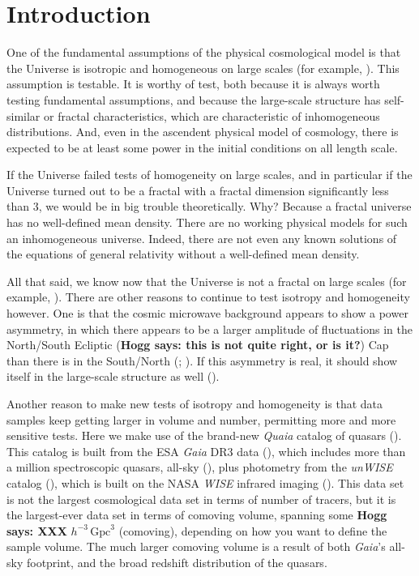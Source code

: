 \documentclass[modern]{aastex631}
\newcommand{\unit}[1]{\mathrm{#1}}
\newcommand{\Gpc}{\unit{Gpc}}
\newcommand{\hogg}[1]{\textbf{Hogg says: #1}}
\begin{document}
\section*{}
\clearpage
\section{Introduction}\label{sec:intro}\noindent
One of the fundamental assumptions of the physical cosmological model is that the Universe is isotropic and homogeneous on large scales (for example, \citealt{peebles, ryden}).
This assumption is testable.
It is worthy of test, both because it is always worth testing fundamental assumptions, and because the large-scale structure has self-similar or fractal characteristics, which are characteristic of inhomogeneous distributions.
And, even in the ascendent physical model of cosmology, there is expected to be at least some power in the initial conditions on all length scale.

If the Universe failed tests of homogeneity on large scales, and in particular if the Universe turned out to be a fractal with a fractal dimension significantly less than 3, we would be in big trouble theoretically.
Why?
Because a fractal universe has no well-defined mean density.
There are no working physical models for such an inhomogeneous universe.
Indeed, there are not even any known solutions of the equations of general relativity without a well-defined mean density.

All that said, we know now that the Universe is not a fractal on large scales (for example, \citealt{hogg05, gonc1, gonc2, pandey}).
There are other reasons to continue to test isotropy and homogeneity however.
One is that the cosmic microwave background appears to show a power asymmetry, in which there appears to be a larger amplitude of fluctuations in the North/South Ecliptic (\hogg{this is not quite right, or is it?}) Cap than there is in the South/North (\citealt{wmapanisotropy}; \citealt{planckanisotropy}).
If this asymmetry is real, it should show itself in the large-scale structure as well (\citealt{zhai}).

Another reason to make new tests of isotropy and homogeneity is that data samples keep getting larger in volume and number, permitting more and more sensitive tests.
Here we make use of the brand-new \textsl{Quaia} catalog of quasars (\citealt{quaia}).
This catalog is built from the ESA \textsl{Gaia} DR3 data (\citealt{gaiadr3}), which includes more than a million spectroscopic quasars, all-sky (\citealt{gaiaquasar}), plus photometry from the \textsl{unWISE} catalog (\citealt{lang, unwise}), which is built on the NASA \textsl{WISE} infrared imaging (\citealt{wise}).
This data set is not the largest cosmological data set in terms of number of tracers, but it is the largest-ever data set in terms of comoving volume, spanning some \hogg{XXX} $h^{-3}\,\Gpc^3$ (comoving), depending on how you want to define the sample volume.
The much larger comoving volume is a result of both \textsl{Gaia}'s all-sky footprint, and the broad redshift distribution of the quasars.
\end{document}
